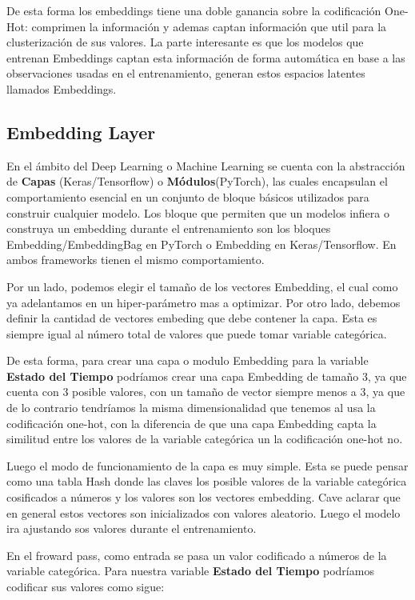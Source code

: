 \documentclass[11pt,a4paper,twoside]{thesis}
\begin{document}
De esta forma los embeddings tiene una doble ganancia sobre la codificación One-Hot: comprimen la información y ademas  captan información que util para la clusterización de sus valores. La parte interesante es que los modelos que entrenan Embeddings captan esta información de forma automática en base a las observaciones usadas en el entrenamiento, generan estos espacios latentes llamados Embeddings.


\subsection{Embedding Layer}

En el ámbito del Deep Learning o Machine Learning se cuenta con la abstracción de \textbf{Capas} (Keras/Tensorflow) o \textbf{Módulos}(PyTorch), las cuales encapsulan el comportamiento esencial en un conjunto de bloque básicos utilizados para construir cualquier modelo. Los bloque que permiten que un modelos infiera o construya un embedding durante el entrenamiento son los bloques Embedding/EmbeddingBag en PyTorch o Embedding en Keras/Tensorflow. En ambos frameworks tienen el mismo comportamiento. 

Por un lado, podemos elegir el tamaño de los vectores Embedding, el cual como ya adelantamos en un hiper-parámetro mas a optimizar. Por otro lado, debemos definir la cantidad de vectores embeding que debe contener la capa. Esta es siempre igual al número total de valores que puede tomar variable categórica.

De esta forma, para crear una capa o modulo Embedding para la variable \textbf{Estado del Tiempo} podríamos crear una capa Embedding de tamaño 3, ya que cuenta con 3 posible valores, con un tamaño de vector siempre menos a 3, ya que de lo contrario tendríamos la misma dimensionalidad que tenemos al usa la codificación one-hot, con la diferencia de que una capa Embedding capta la similitud entre los valores de la variable categórica un la codificación one-hot no.

Luego el modo de funcionamiento de la capa es muy simple. Esta se puede pensar como una tabla Hash donde las claves los posible valores de la variable categórica cosificados a números y los valores son los vectores embedding. Cave aclarar que en general estos vectores son inicializados con valores aleatorio. Luego el modelo ira ajustando sos valores durante el entrenamiento.

En el froward pass, como entrada se pasa un valor codificado a números de la variable categórica. Para nuestra variable \textbf{Estado del Tiempo} podríamos codificar sus valores como sigue:
\end{document}
